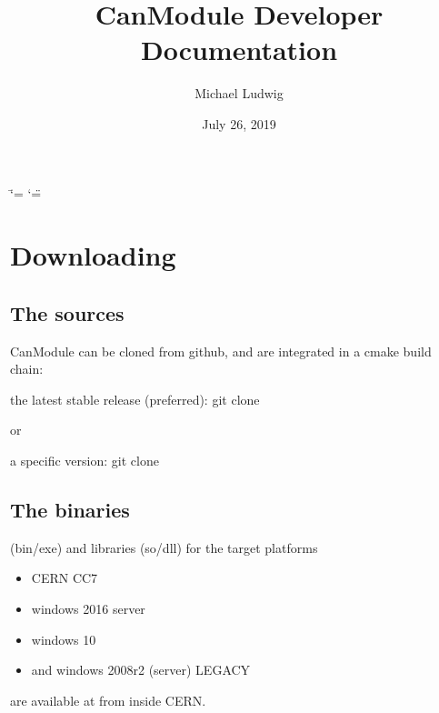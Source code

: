 \documentclass[letterpaper,10pt,english]{sphinxmanual}
\title{CanModule Developer Documentation}
\date{July 26, 2019}
\author{Michael Ludwig}
\begin{document}
\ifdefined\shorthandoff
  \ifnum\catcode`\=\string=\active\shorthandoff{=}\fi
  \ifnum\catcode`\"=\active{}\fi
\fi

\pagestyle{empty}
\sphinxmaketitle
\pagestyle{plain}
\sphinxtableofcontents
\pagestyle{normal}
\label{\detokenize{index::doc}}



\chapter{Downloading}
\label{\detokenize{downloading:downloading}}\label{\detokenize{downloading::doc}}

\section{The sources}
\label{\detokenize{downloading:the-sources}}
CanModule can be cloned from github, and are integrated in a cmake build chain:

the latest stable release (preferred):
git clone  

or

a specific version:
git clone  


\section{The binaries}
\label{\detokenize{downloading:the-binaries}}
(bin/exe) and libraries (so/dll) for the target platforms
\begin{itemize}
\item {} 
CERN CC7

\item {} 
windows 2016 server

\item {} 
windows 10

\item {} 
and windows 2008r2 (server) LEGACY

\end{itemize}

are available at  from inside CERN.
\end{document}
